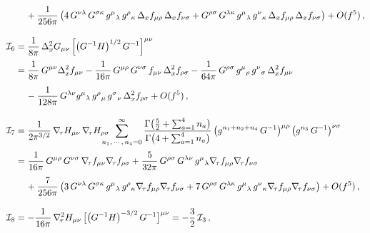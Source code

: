 \documentclass[11pt]{article}
\newcommand{\CI}{\mathcal{I}}
\begin{document}
\begin{align*}
		& \quad\hspace{0.5mm} + \frac{1}{256 \pi} \, \bigl( 4 \, G^{\nu\lambda} \, G^{\sigma \kappa} \, g^\mu{}_\lambda \, g^\rho{}_\kappa \, \Delta_{x} f_{\mu\rho} \, \Delta_{x} f_{\nu\sigma} + G^{\rho\sigma} \, G^{\lambda \kappa} \, g^\mu{}_\lambda \, g^\nu{}_\kappa \, \Delta_{x} f_{\mu\rho} \, \Delta_{x} f_{\nu\sigma} \bigr) + O (f^5) \,, \\[10pt]
	\CI_6 & = \frac{1}{8 \pi} \, \Delta_{x}^2 G_{\mu\nu} \, \Bigl[ \bigl( G^{-1} H \bigr)^{1/2} \, G^{-1} \Bigr]^{\mu\nu} \notag \\[2pt]
		& = \frac{1}{8\pi} \, G^{\mu\nu} \Delta_x^2 f_{\mu\nu} - \frac{1}{16\pi} \, G^{\mu\rho} \, G^{\nu\sigma} \, f_{\mu\nu} \, \Delta_{x}^2 f_{\rho\sigma} - \frac{1}{64\pi} \, G^{\rho\sigma} \, g^\mu{}_\rho \, g^\nu{}_\sigma \, \Delta_{x}^2 f_{\mu\nu} \notag \\[4pt]
		& \quad\hspace{0.5mm} - \frac{1}{128 \pi} \, G^{\lambda\nu} g^\mu{}_\lambda \, g^\rho{}_\mu \, g^\sigma{}_\nu \, \Delta_{x}^2 f_{\rho\sigma} + O(f^5) \,, \\[10pt]
	\CI_7 & = \frac{1}{2\pi^{3/2}} \, \nabla_{\!\tau} H_{\mu\nu} \, \nabla_{\!\tau} H_{\rho\sigma}
		\!\!\!\!\!\! \sum_{n_1,\, \cdots,\, n_4 = 0}^\infty \frac{\Gamma\bigl( \frac{5}{2} + \sum_{a = 1}^4 n_a \bigr)}{\Gamma \bigl( 4 + \sum_{a = 1}^4 n_a \bigr)} \, \bigl( g^{n_1 + n_2 + n_4} \, G^{-1} \bigr)^{\mu\rho} \, \bigl( g^{n_3} \, G^{-1} \bigr)^{\nu\sigma} \notag \\[2pt]
		& = \frac{1}{16 \pi} \, G^{\mu\rho} \, G^{\nu\sigma} \, \nabla_{\!\tau} f_{\mu\nu} \nabla_{\!\tau} f_{\rho\sigma} + \frac{5}{32 \pi} \, G^{\rho\sigma} \, G^{\lambda\nu} \, g^\mu{}_\lambda \nabla_{\!\tau} f_{\mu\rho} \nabla_{\!\tau} f_{\nu\sigma} \notag \\[4pt]
		& \quad\hspace{0.5mm} + \frac{7}{256 \pi} \, \bigl( 3 \, G^{\nu\lambda} \, G^{\sigma \kappa} \, g^\mu{}_\lambda \, g^\rho{}_\kappa \nabla_{\!\tau} f_{\mu\rho} \nabla_{\!\tau} f_{\nu\sigma} + 7 \, G^{\rho\sigma} \, G^{\lambda \kappa} \, g^\mu{}_\lambda \, g^\nu{}_\kappa \nabla_{\!\tau} f_{\mu\rho} \nabla_{\!\tau} f_{\nu\sigma} \bigr) + O (f^5)\,, \\[10pt] 
	\CI_8 & = - \frac{1}{16\pi} \, \nabla_{\!\tau}^2 H_{\mu\nu} \, \bigl[ \bigl( G^{-1} H \bigr)^{-3/2} \, G^{-1} \bigr]^{\mu\nu} = - \frac{3}{2} \, \CI_3\,, \\[10pt]

\end{align*}
\end{document}
